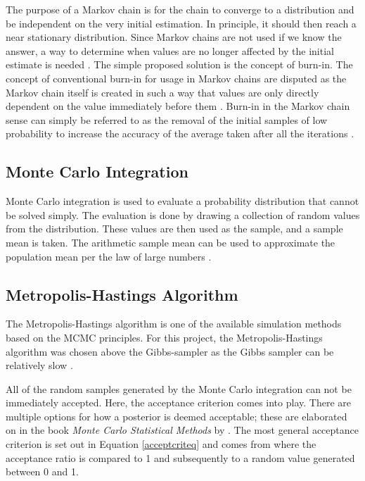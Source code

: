 	The purpose of a Markov chain is for the chain to converge to a distribution and be independent on the very initial estimation. 
	In principle, it should then reach a near stationary distribution.
	Since Markov chains are not used if we know the answer, a way to determine when values are no longer affected by the initial estimate is needed \cite{Gilks:1996}. 
	The simple proposed solution is the concept of burn-in. 
	The concept of conventional burn-in for usage in Markov chains are disputed as the Markov chain itself is created in such a way that values are only directly dependent on the value immediately before them \cite{Meyn:1993}.
	Burn-in in the Markov chain sense can simply be referred to as the removal of the initial samples of low probability to increase the accuracy of the average taken after all the iterations \cite{John:2016}.
		
	\subsection{Monte Carlo Integration}\label{MCint_sec}
	Monte Carlo integration is used to evaluate a probability distribution that cannot be solved simply. 
	The evaluation is done by drawing a collection of random values from the distribution.
	These values are then used as the sample, and a sample mean is taken.
	The arithmetic sample mean can be used to approximate the population mean per the law of large numbers \citep{Gilks:1996}.
	

\subsection{Metropolis-Hastings Algorithm}

The Metropolis-Hastings algorithm is one of the available simulation methods based on the MCMC principles. 
For this project, the Metropolis-Hastings algorithm was chosen above the Gibbs-sampler as the Gibbs sampler can be relatively slow \cite{Murphy:2012}.

All of the random samples generated by the Monte Carlo integration can not be immediately accepted.
	Here, the acceptance criterion comes into play.
	There are multiple options for how a posterior is deemed acceptable; these are elaborated on in the book  \textit{Monte Carlo Statistical Methods} by \citeauthor{Robert:2004}. 
	The most general acceptance criterion is set out in Equation \ref{acceptcriteq} and comes from \citet{Kaipo:2005} where the acceptance ratio is compared to 1 and subsequently to a random value generated between 0 and 1.
	
